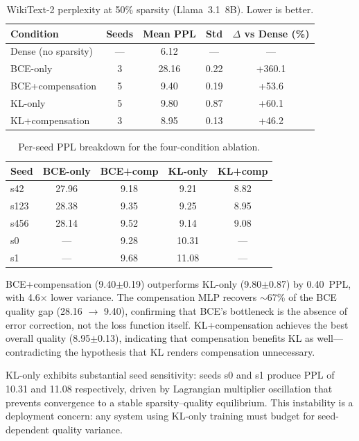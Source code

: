 \documentclass[11pt]{article}
\begin{document}
\begin{table}[h]
\centering
\caption{WikiText-2 perplexity at 50\% sparsity (Llama~3.1~8B). Lower is better.}
\label{tab:four_cond}
\small
\begin{tabular}{lcccc}
\toprule
Condition & Seeds & Mean PPL & Std & $\Delta$ vs Dense (\%) \\
\midrule
Dense (no sparsity) & --- & 6.12 & --- & --- \\
BCE-only & 3 & 28.16 & 0.22 & +360.1 \\
BCE+compensation & 5 & 9.40 & 0.19 & +53.6 \\
KL-only & 5 & 9.80 & 0.87 & +60.1 \\
KL+compensation & 3 & 8.95 & 0.13 & +46.2 \\
\bottomrule
\end{tabular}
\end{table}

\begin{table}[h]
\centering
\caption{Per-seed PPL breakdown for the four-condition ablation.}
\label{tab:per_seed}
\small
\begin{tabular}{lcccc}
\toprule
Seed & BCE-only & BCE+comp & KL-only & KL+comp \\
\midrule
s42 & 27.96 & 9.18 & 9.21 & 8.82 \\
s123 & 28.38 & 9.35 & 9.25 & 8.95 \\
s456 & 28.14 & 9.52 & 9.14 & 9.08 \\
s0 & --- & 9.28 & 10.31 & --- \\
s1 & --- & 9.68 & 11.08 & --- \\
\bottomrule
\end{tabular}
\end{table}

BCE+compensation (9.40$\pm$0.19) outperforms KL-only (9.80$\pm$0.87) by 0.40~PPL, with 4.6$\times$ lower variance.
The compensation MLP recovers $\sim$67\% of the BCE quality gap (28.16 $\to$ 9.40), confirming that BCE's bottleneck is the absence of error correction, not the loss function itself.
KL+compensation achieves the best overall quality (8.95$\pm$0.13), indicating that compensation benefits KL as well---contradicting the hypothesis that KL renders compensation unnecessary.

KL-only exhibits substantial seed sensitivity: seeds s0 and s1 produce PPL of 10.31 and 11.08 respectively, driven by Lagrangian multiplier oscillation that prevents convergence to a stable sparsity--quality equilibrium.
This instability is a deployment concern: any system using KL-only training must budget for seed-dependent quality variance.
\end{document}
